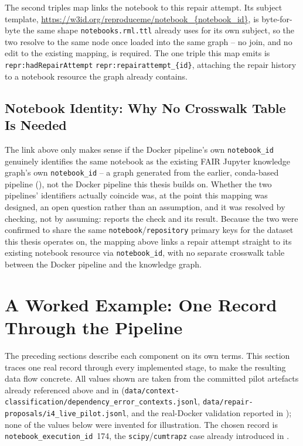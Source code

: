 The second triples map links the notebook to this repair attempt. Its
subject template, \url{https://w3id.org/reproduceme/notebook_{notebook_id}},
is byte-for-byte the same shape \texttt{notebooks.rml.ttl} already uses for
its own subject, so the two resolve to the same node once loaded into the
same graph -- no join, and no edit to the existing mapping, is required. The
one triple this map emits is
\texttt{repr:hadRepairAttempt} \texttt{repr:repairattempt\_\{id\}}, attaching
the repair history to a notebook resource the graph already contains.

\subsection{Notebook Identity: Why No Crosswalk Table Is Needed}
\label{sec:m-resultlogger-identity}

The link above only makes sense if the Docker pipeline's own
\texttt{notebook\_id} genuinely identifies the same notebook as the existing
FAIR Jupyter knowledge graph's own \texttt{notebook\_id} -- a graph generated
from the earlier, conda-based pipeline (), not the
Docker pipeline this thesis builds on. Whether the two pipelines' identifiers
actually coincide was, at the point this mapping was designed, an open
question rather than an assumption, and it was resolved by checking, not by
assuming:  reports the check and its result. Because the two
were confirmed to share the same \texttt{notebook}/\texttt{repository}
primary keys for the dataset this thesis operates on, the mapping above links
a repair attempt straight to its existing notebook resource via
\texttt{notebook\_id}, with no separate crosswalk table between the Docker
pipeline and the knowledge graph.

\section{A Worked Example: One Record Through the Pipeline}
\label{sec:m-worked-example}

The preceding sections describe each component on its own terms. This
section traces one real record through every implemented stage, to make the
resulting data flow concrete. All values shown are taken from the committed
pilot artefacts already referenced above and in 
(\texttt{data/context-classification/\allowbreak dependency\_error\_contexts.jsonl},
\texttt{data/repair-proposals/\allowbreak i4\_live\_pilot.jsonl}, and the real-Docker
validation reported in ); none of the values below were
invented for illustration. The chosen record is
\texttt{notebook\_execution\_id}~174, the \texttt{scipy}/\texttt{cumtrapz}
case already introduced in .

